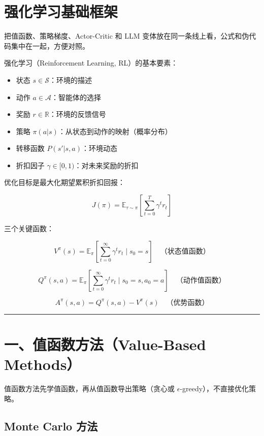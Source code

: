 \section{强化学习基础框架}

把值函数、策略梯度、Actor-Critic 和 LLM 变体放在同一条线上看，公式和伪代码集中在一起，方便对照。

强化学习（Reinforcement Learning, RL）的基本要素：

\begin{itemize}
  \item 状态 \(s \in \mathcal{S}\)：环境的描述
  \item 动作 \(a \in \mathcal{A}\)：智能体的选择
  \item 奖励 \(r \in \mathbb{R}\)：环境的反馈信号
  \item 策略 \(\pi(a|s)\)：从状态到动作的映射（概率分布）
  \item 转移函数 \(P(s'|s, a)\)：环境动态
  \item 折扣因子 \(\gamma \in [0, 1)\)：对未来奖励的折扣
\end{itemize}

优化目标是最大化期望累积折扣回报：

\[
J(\pi) = \mathbb{E}_{\tau \sim \pi}\left[\sum_{t=0}^{T} \gamma^t r_t\right]
\]

三个关键函数：

\[
V^\pi(s) = \mathbb{E}_\pi\left[\sum_{t=0}^\infty \gamma^t r_t \mid s_0 = s\right] \quad \text{（状态值函数）}
\]

\[
Q^\pi(s, a) = \mathbb{E}_\pi\left[\sum_{t=0}^\infty \gamma^t r_t \mid s_0 = s, a_0 = a\right] \quad \text{（动作值函数）}
\]

\[
A^\pi(s, a) = Q^\pi(s, a) - V^\pi(s) \quad \text{（优势函数）}
\]

\hrule

\section{一、值函数方法（Value-Based Methods）}

值函数方法先学值函数，再从值函数导出策略（贪心或 \(\epsilon\)-greedy），不直接优化策略。

\subsection{Monte Carlo 方法}

